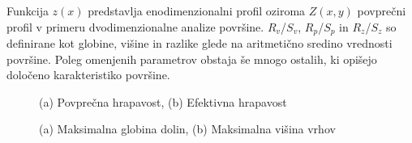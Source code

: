 \documentclass[a4paper,twoside,openright,12pt,slovene]{book}
\begin{document}
Funkcija $z(x)$ predstavlja enodimenzionalni profil oziroma $Z(x,y)$ povprečni profil v primeru dvodimenzionalne analize površine. $R_{v}$/$S_{v}$, $R_{p}$/$S_{p}$ in $R_{z}$/$S_{z}$ so definirane kot globine, višine in razlike glede na aritmetično sredino vrednosti površine. Poleg omenjenih parametrov obstaja še mnogo ostalih, ki opišejo določeno karakteristiko površine. \cite{SR} \cite{real_SR}

\begin{figure}[htp]
    \centering
    \caption{(a) Povprečna hrapavost, (b) Efektivna hrapavost \cite{real_SR}}
    \label{fig:SaSq}
\end{figure}

\begin{figure}[htp]
    \centering
    \caption{(a) Maksimalna globina dolin, (b) Maksimalna višina vrhov \cite{real_SR}}
    \label{fig:SvSp}
\end{figure}
\end{document}
